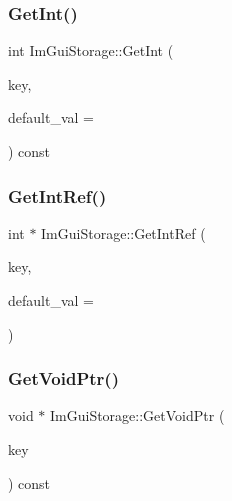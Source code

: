 \hypertarget{struct_im_gui_storage_ac86b64f5c69a15de6c6c326963eca64a}{}\label{struct_im_gui_storage_ac86b64f5c69a15de6c6c326963eca64a} 
\subsubsection{\texorpdfstring{Get\+Int()}{GetInt()}}
{\footnotesize\ttfamily int Im\+Gui\+Storage\+::\+Get\+Int (\begin{DoxyParamCaption}\item[{Im\+Gui\+ID}]{key,  }\item[{int}]{default\+\_\+val = {} }\end{DoxyParamCaption}) const}

\hypertarget{struct_im_gui_storage_a28673fa7839263f3066ccb8e93e748a9}{}\label{struct_im_gui_storage_a28673fa7839263f3066ccb8e93e748a9} 
\subsubsection{\texorpdfstring{Get\+Int\+Ref()}{GetIntRef()}}
{\footnotesize\ttfamily int $\ast$ Im\+Gui\+Storage\+::\+Get\+Int\+Ref (\begin{DoxyParamCaption}\item[{Im\+Gui\+ID}]{key,  }\item[{int}]{default\+\_\+val = {} }\end{DoxyParamCaption})}

\hypertarget{struct_im_gui_storage_aaf87a98ede89da09113b0189f6d878ca}{}\label{struct_im_gui_storage_aaf87a98ede89da09113b0189f6d878ca} 
\subsubsection{\texorpdfstring{Get\+Void\+Ptr()}{GetVoidPtr()}}
{\footnotesize\ttfamily void $\ast$ Im\+Gui\+Storage\+::\+Get\+Void\+Ptr (\begin{DoxyParamCaption}\item[{Im\+Gui\+ID}]{key }\end{DoxyParamCaption}) const}

